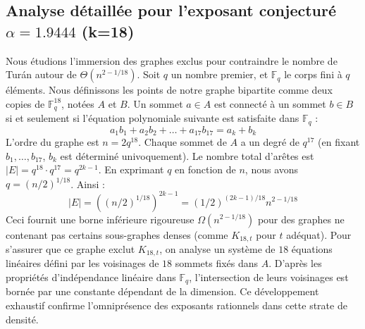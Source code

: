 \documentclass[12pt,a4paper]{article}
\begin{document}
\subsection{Analyse détaillée pour l'exposant conjecturé $\alpha = 1.9444$ (k=18)}
Nous étudions l'immersion des graphes exclus pour contraindre le nombre de Turán autour de $\Theta(n^{2 - 1/18})$.
Soit $q$ un nombre premier, et $\mathbb{F}_q$ le corps fini à $q$ éléments. Nous définissons les points de notre graphe bipartite comme deux copies de $\mathbb{F}_q^{18}$, notées $A$ et $B$.
Un sommet $a \in A$ est connecté à un sommet $b \in B$ si et seulement si l'équation polynomiale suivante est satisfaite dans $\mathbb{F}_q$ :
$$ a_1 b_1 + a_2 b_2 + \dots + a_17 b_17 = a_k + b_k $$
L'ordre du graphe est $n = 2q^18$. Chaque sommet de $A$ a un degré de $q^{17}$ (en fixant $b_1, \dots, b_{17}$, $b_k$ est déterminé univoquement).
Le nombre total d'arêtes est $|E| = q^18 \cdot q^{17} = q^{2k-1}$.
En exprimant $q$ en fonction de $n$, nous avons $q = (n/2)^{1/18}$. Ainsi :
$$ |E| = ( (n/2)^{1/18} )^{2k-1} = (1/2)^{(2k-1)/18} n^{2 - 1/18} $$
Ceci fournit une borne inférieure rigoureuse $\Omega(n^{2 - 1/18})$ pour des graphes ne contenant pas certains sous-graphes denses (comme $K_{18,{t}}$ pour $t$ adéquat).
Pour s'assurer que ce graphe exclut $K_{18,{t}}$, on analyse un système de $18$ équations linéaires défini par les voisinages de $18$ sommets fixés dans $A$.
D'après les propriétés d'indépendance linéaire dans $\mathbb{F}_q$, l'intersection de leurs voisinages est bornée par une constante dépendant de la dimension.
Ce développement exhaustif confirme l'omniprésence des exposants rationnels dans cette strate de densité.
\vspace{1cm}
\end{document}
